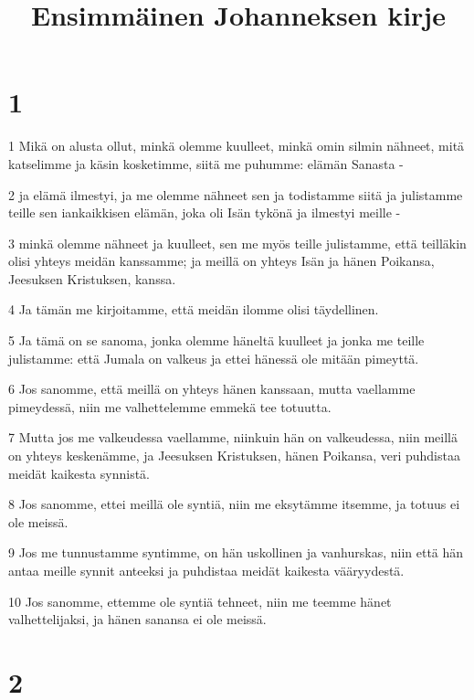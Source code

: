 

\title{Ensimmäinen Johanneksen kirje}


\chapter{1}

\par 1 Mikä on alusta ollut, minkä olemme kuulleet, minkä omin silmin nähneet, mitä katselimme ja käsin kosketimme, siitä me puhumme: elämän Sanasta -
\par 2 ja elämä ilmestyi, ja me olemme nähneet sen ja todistamme siitä ja julistamme teille sen iankaikkisen elämän, joka oli Isän tykönä ja ilmestyi meille -
\par 3 minkä olemme nähneet ja kuulleet, sen me myös teille julistamme, että teilläkin olisi yhteys meidän kanssamme; ja meillä on yhteys Isän ja hänen Poikansa, Jeesuksen Kristuksen, kanssa.
\par 4 Ja tämän me kirjoitamme, että meidän ilomme olisi täydellinen.
\par 5 Ja tämä on se sanoma, jonka olemme häneltä kuulleet ja jonka me teille julistamme: että Jumala on valkeus ja ettei hänessä ole mitään pimeyttä.
\par 6 Jos sanomme, että meillä on yhteys hänen kanssaan, mutta vaellamme pimeydessä, niin me valhettelemme emmekä tee totuutta.
\par 7 Mutta jos me valkeudessa vaellamme, niinkuin hän on valkeudessa, niin meillä on yhteys keskenämme, ja Jeesuksen Kristuksen, hänen Poikansa, veri puhdistaa meidät kaikesta synnistä.
\par 8 Jos sanomme, ettei meillä ole syntiä, niin me eksytämme itsemme, ja totuus ei ole meissä.
\par 9 Jos me tunnustamme syntimme, on hän uskollinen ja vanhurskas, niin että hän antaa meille synnit anteeksi ja puhdistaa meidät kaikesta vääryydestä.
\par 10 Jos sanomme, ettemme ole syntiä tehneet, niin me teemme hänet valhettelijaksi, ja hänen sanansa ei ole meissä.

\chapter{2}

